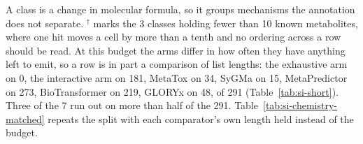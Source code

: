 \begin{table}[t]
\begin{threeparttable}
\begin{tabular}{@{}lrrrrrrrr@{}}
\bottomrule
\end{tabular}
\begin{tablenotes}[flushleft]\footnotesize
\item A class is a change in molecular formula, so it groups mechanisms the annotation does not separate. $^{\dagger}$ marks the 3 classes holding fewer than 10 known metabolites, where one hit moves a cell by more than a tenth and no ordering across a row should be read. At this budget the arms differ in how often they have anything left to emit, so a row is in part a comparison of list lengths: the exhaustive arm on 0, the interactive arm on 181, MetaTox on 34, SyGMa on 15, MetaPredictor on 273, BioTransformer on 219, GLORYx on 48, of 291 (Table~\ref{tab:si-short}). Three of the 7 run out on more than half of the 291. Table~\ref{tab:si-chemistry-matched} repeats the split with each comparator's own length held instead of the budget.
\end{tablenotes}
\end{threeparttable}
\end{table}
